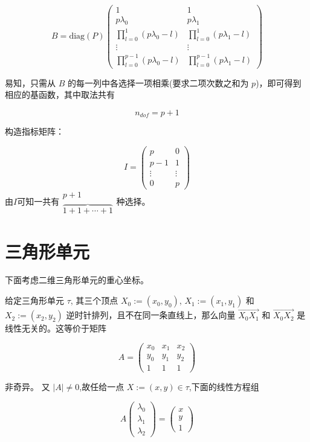 \documentclass[12pt,a4paper]{article}
\begin{document}
$$
B = \mathrm{diag}(P)
\begin{pmatrix}
1 & 1\\
p\lambda_0 & p\lambda_1\\
\prod_{l=0}^{1}(p\lambda_0 - l) & \prod_{l=0}^{1}(p\lambda_1 - l)\\
\vdots & \vdots \\
\prod_{l=0}^{p-1}(p\lambda_0 - l) & \prod_{l=0}^{p-1}(p\lambda_1 - l) 
\end{pmatrix}
$$

易知，只需从 $B$ 的每一列中各选择一项相乘(要求二项次数之和为 $p$)，即可得到相应的基函数，其中取法共有 

$$
n_{dof} = {p+1}
$$

构造指标矩阵：

$$
I = \begin{pmatrix}
p  & 0 \\ p-1 & 1 \\ \vdots & \vdots \\ 0 & p 
\end{pmatrix}
$$
由$I$可知一共有$\begin{matrix} p+1 \\ \overbrace{ 1+1+\cdots+1 }
\end{matrix}$种选择。

\section{三角形单元}
下面考虑二维三角形单元的重心坐标。

给定三角形单元 $\tau$, 其三个顶点 $X_0 :=(x_0,y_0)$, $X_1 :=(x_1,y_1)$ 和 $X_2 :=(x_2,y_2)$ 逆时针排列，且不在同一条直线上，那么向量 $\overrightarrow{X_0 X_1}$ 和 $\overrightarrow{X_0 X_2}$ 是线性无关的。这等价于矩阵

$$
A = 
\begin{pmatrix}
x_0 & x_1 & x_2 \\
y_0 & y_1 & y_2 \\
1   & 1   & 1 
\end{pmatrix}
$$

非奇异。
又 $|A|\ne 0$,故任给一点 $X:=(x,y)\in\tau$,下面的线性方程组

$$
A 
\begin{pmatrix}
\lambda_0 \\
\lambda_1\\
\lambda_2  
\end{pmatrix}
=\begin{pmatrix}
x \\
y\\
1  
\end{pmatrix}
$$
\end{document}
